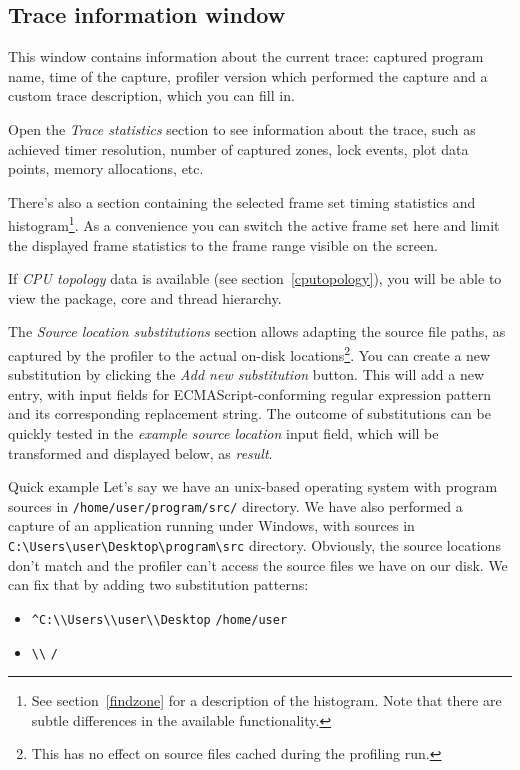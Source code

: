 \documentclass[hidelinks,titlepage,a4paper]{article}
\begin{document}
\subsection{Trace information window}
\label{traceinfo}

This window contains information about the current trace: captured program name, time of the capture, profiler version which performed the capture and a custom trace description, which you can fill in.

Open the \emph{Trace statistics} section to see information about the trace, such as achieved timer resolution, number of captured zones, lock events, plot data points, memory allocations, etc.

There's also a section containing the selected frame set timing statistics and histogram\footnote{See section~\ref{findzone} for a description of the histogram. Note that there are subtle differences in the available functionality.}. As a convenience you can switch the active frame set here and limit the displayed frame statistics to the frame range visible on the screen.

If \emph{CPU topology} data is available (see section~\ref{cputopology}), you will be able to view the package, core and thread hierarchy.

The \emph{Source location substitutions} section allows adapting the source file paths, as captured by the profiler to the actual on-disk locations\footnote{This has no effect on source files cached during the profiling run.}. You can create a new substitution by clicking the \emph{Add new substitution} button. This will add a new entry, with input fields for ECMAScript-conforming regular expression pattern and its corresponding replacement string. The outcome of substitutions can be quickly tested in the \emph{example source location} input field, which will be transformed and displayed below, as \emph{result}.

\begin{bclogo}[
noborder=true,
couleur=black!5,
logo=\bclampe
]{Quick example}
Let's say we have an unix-based operating system with program sources in \texttt{/home/user/program/src/} directory. We have also performed a capture of an application running under Windows, with sources in \texttt{C:\textbackslash{}Users\textbackslash{}user\textbackslash{}Desktop\textbackslash{}program\textbackslash{}src} directory. Obviously, the source locations don't match and the profiler can't access the source files we have on our disk. We can fix that by adding two substitution patterns:

\begin{itemize}
\item \texttt{\^{}C:\textbackslash{}\textbackslash{}Users\textbackslash{}\textbackslash{}user\textbackslash{}\textbackslash{}Desktop} \hspace{1em}\textrightarrow\hspace{1em} \texttt{/home/user}
\item \texttt{\textbackslash{}\textbackslash{}} \hspace{1em}\textrightarrow\hspace{1em} \texttt{/}
\end{itemize}
\end{bclogo}
\end{document}
